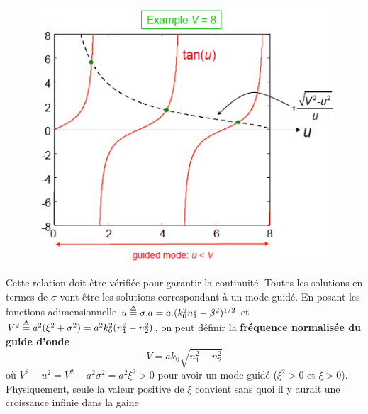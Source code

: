 \begin{figure}
	\vspace{-9mm}
	\includegraphics[scale=0.6]{ch1/image14}
	\end{figure}
Cette relation doit être vérifiée pour garantir la continuité. Toutes les solutions en termes de 
$\sigma$ vont être les solutions correspondant à un mode guidé. En posant les fonctions 
adimensionnelle $u \buildrel \Delta \over = \sigma .a = a.{(k_0^2n_1^2 - {\beta ^2})^{1/2}}$ et ${V^2} \buildrel \Delta \over = {a^2}({\xi ^2} + {\sigma ^2}) = {a^2}k_0^2(n_1^2 - n_2^2)$, on peut définir la \textbf{fréquence normalisée du guide d'onde}
\begin{equation}
V = a{k_0}\sqrt {n_1^2 - n_2^2} 
\end{equation}
où ${V^2} - {u^2} = {V^2} - {a^2}{\sigma ^2} = {a^2}{\xi ^2} > 0$ pour avoir un mode guidé ($\xi^2 > 0$ et $\xi > 0$). Physiquement, seule la valeur 
positive de $\xi$ convient sans quoi il y aurait une croissance infinie dans la gaine\\

\ \\

